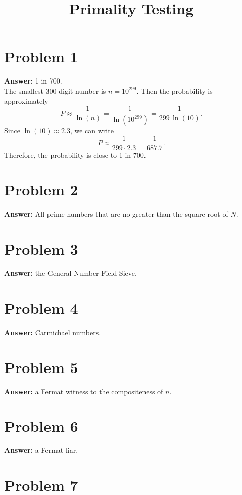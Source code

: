 \documentclass[11pt]{article}
\date{}
\title{Primality Testing}
\begin{document}
\thispagestyle{empty}
\pagestyle{empty}
\section*{Problem 1}
\label{sec:orgb54f7fe}

\textbf{Answer:} 1 in 700.\\

The smallest 300-digit number is \(n=10^{299}\). Then the probability is
approximately
\begin{equation}
P\approx\frac{1}{\ln(n)}=\frac{1}{\ln\left(10^{299}\right)}=\frac{1}{299\,\ln(10)}.
\end{equation}
Since \(\ln(10)\approx 2.3\), we can write
\begin{equation}
P\approx\frac{1}{299\cdot 2.3}=\frac{1}{687.7}.
\end{equation}
Therefore, the probability is close to 1 in 700.
\section*{Problem 2}
\label{sec:org89e0283}

\textbf{Answer:} All prime numbers that are no greater than the square root of \(N\).
\section*{Problem 3}
\label{sec:orga4cbe57}

\textbf{Answer:} the General Number Field Sieve.
\section*{Problem 4}
\label{sec:orgb0b2607}

\textbf{Answer:} Carmichael numbers.
\section*{Problem 5}
\label{sec:org7437557}

\textbf{Answer:} a Fermat witness to the compositeness of \(n\).
\section*{Problem 6}
\label{sec:orgedece32}

\textbf{Answer:} a Fermat liar.
\section*{Problem 7}
\label{sec:org13d4624}
\end{document}
